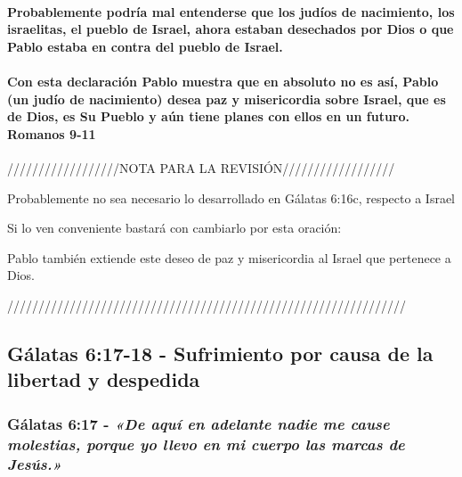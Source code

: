\documentclass[11a pt,twoside]{article}
\newcommand{\scripture}[1]{%
  {\fontsize{12pt}{16pt}\selectfont\ScriptureFont\itshape #1}%
}
\def\emph#1{#1}%
\let\oldsubsection\subsection
\renewcommand{\subsection}{\needspace{5\baselineskip}\oldsubsection}
\let\oldsubsubsection\subsubsection
\renewcommand{\subsubsection}{\needspace{4\baselineskip}\oldsubsubsection}
\let\oldparagraph\paragraph
\renewcommand{\paragraph}{\needspace{3\baselineskip}\oldparagraph}
\begin{document}
\paragraph{Probablemente podría mal entenderse que los judíos de
nacimiento, los israelitas, el pueblo de Israel, ahora estaban
desechados por Dios o que Pablo estaba en contra del pueblo de
Israel.}\label{probablemente-podruxeda-mal-entenderse-que-los-juduxedos-de-nacimiento-los-israelitas-el-pueblo-de-israel-ahora-estaban-desechados-por-dios-o-que-pablo-estaba-en-contra-del-pueblo-de-israel.}

\paragraph{Con esta declaración Pablo muestra que en absoluto no es así,
Pablo (un judío de nacimiento) desea paz y misericordia sobre Israel,
que es de Dios, es Su Pueblo y aún tiene planes con ellos en un futuro.
Romanos
9-11}\label{con-esta-declaraciuxf3n-pablo-muestra-que-en-absoluto-no-es-asuxed-pablo-un-juduxedo-de-nacimiento-desea-paz-y-misericordia-sobre-israel-que-es-de-dios-es-su-pueblo-y-auxfan-tiene-planes-con-ellos-en-un-futuro.-romanos-9-11}

\emph{//////////////////NOTA PARA LA REVISIÓN//////////////////}

\emph{Probablemente no sea necesario lo desarrollado en Gálatas 6:16c,
respecto a Israel}

\emph{Si lo ven conveniente bastará con cambiarlo por esta oración:}

\emph{Pablo también extiende este deseo de paz y misericordia al Israel
que pertenece a Dios.}

\emph{////////////////////////////////////////////////////////////////}

\subsection{Gálatas 6:17-18 - Sufrimiento por causa de la libertad y
despedida}\label{guxe1latas-617-18---sufrimiento-por-causa-de-la-libertad-y-despedida}

\subsubsection{\texorpdfstring{Gálatas 6:17 -
\scripture{«De aquí en adelante nadie me cause molestias, porque yo llevo en mi cuerpo las marcas de Jesús.»}}{Gálatas 6:17 - }}\label{guxe1latas-617---de-aquuxed-en-adelante-nadie-me-cause-molestias-porque-yo-llevo-en-mi-cuerpo-las-marcas-de-jesuxfas.}
\end{document}
